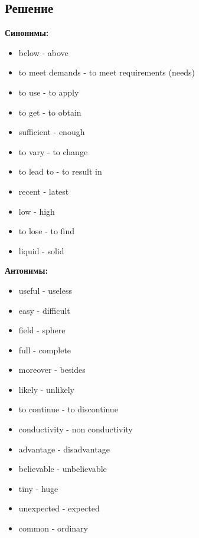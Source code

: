 \subsection*{Решение}
\textbf{Синонимы:}
\begin{itemize}
      \item below - above
      \item to meet demands - to meet requirements (needs)
      \item to use - to apply
      \item to get - to obtain
      \item sufficient - enough
      \item to vary - to change
      \item to lead to - to result in
      \item recent - latest
      \item low - high
      \item to lose - to find
      \item liquid - solid
\end{itemize}

\textbf{Антонимы:}
\begin{itemize}
      \item useful - useless
      \item easy - difficult
      \item field - sphere
      \item full - complete
      \item moreover - besides
      \item likely - unlikely
      \item to continue - to discontinue
      \item conductivity - non conductivity
      \item advantage - disadvantage
      \item believable - unbelievable
      \item tiny - huge
      \item unexpected - expected
      \item common - ordinary
\end{itemize}

